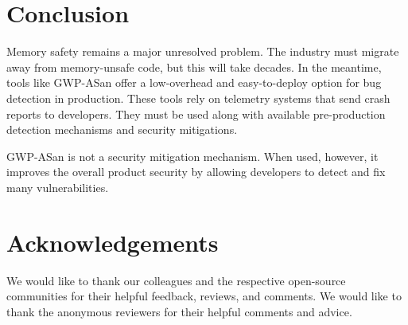 \section{Conclusion}

Memory safety remains a major unresolved problem. The industry must migrate
away from memory-unsafe code, but this will take decades. In the meantime,
tools like GWP-ASan offer a low-overhead and easy-to-deploy option for bug
detection in production. These tools rely on telemetry systems that send crash
reports to developers. They must be used along with available pre-production
detection mechanisms and security mitigations.

GWP-ASan is not a security mitigation mechanism. When used, however, it
improves the overall product security by allowing developers to detect and fix
many vulnerabilities.

\section*{Acknowledgements}

We would like to thank our colleagues and the respective open-source
communities for their helpful feedback, reviews, and comments.  We would like
to thank the anonymous reviewers for their helpful comments and advice.
